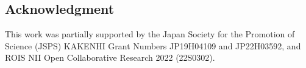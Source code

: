 \subsection*{Acknowledgment}
This work was partially supported by the Japan Society for the Promotion of
Science (JSPS) KAKENHI Grant Numbers JP19H04109 and JP22H03592, and ROIS NII Open
Collaborative Research 2022 (22S0302).